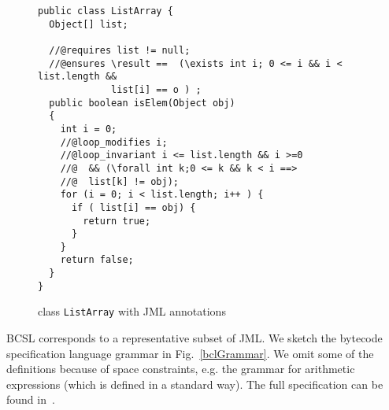  
\begin{figure}[!h]
\begin{verbatim}
public class ListArray {
  Object[] list;

  //@requires list != null;
  //@ensures \result ==  (\exists int i; 0 <= i && i < list.length &&  
             list[i] == o ) ; 
  public boolean isElem(Object obj)
  {
    int i = 0;
    //@loop_modifies i;
    //@loop_invariant i <= list.length && i >=0 
    //@  && (\forall int k;0 <= k && k < i ==> 
    //@  list[k] != obj); 
    for (i = 0; i < list.length; i++ ) {
      if ( list[i] == obj) {
        return true;	
      }
    }
    return false;
  }
}
\end{verbatim}
\caption{class \texttt{ListArray} with JML annotations} 
\label{replaceSrc}
\end{figure}
BCSL corresponds to a representative subset of JML.
We sketch the bytecode specification language grammar in Fig.~\ref{bclGrammar}. We omit some of the definitions 
because of space constraints, e.g. the grammar for arithmetic expressions (which is defined in a standard way). The full specification can be found in~\cite{JML2BCSpec}.  
